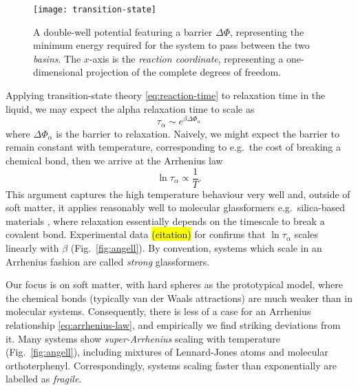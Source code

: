 \begin{SCfigure}
  \texttt{[image: transition-state]}
  \caption[Transition state theory]{
    A double-well potential featuring a barrier $\Delta\Phi$, representing the minimum energy required for the system to pass between the two \emph{basins}.
    The $x$-axis is the \emph{reaction coordinate}, representing a one-dimensional projection of the complete degrees of freedom.
  }
  \label{fig:transition-state}
\end{SCfigure}

Applying transition-state theory \eqref{eq:reaction-time} to relaxation time in the liquid, we may expect the alpha relaxation time to scale as
\begin{equation}\label{eq:tau-barrier}
  \tau_\alpha \sim e^{\beta \Delta \Phi_\alpha}
\end{equation}
where $\Delta \Phi_\alpha$ is the barrier to relaxation.
Naively, we might expect the barrier to remain constant with temperature, corresponding to e.g.\ the cost of breaking a chemical bond, then we arrive at the Arrhenius law
\begin{equation}\label{eq:arrhenius-law}
  \ln{\tau_\alpha} \propto \frac{1}{T}.
\end{equation}
This argument captures the high temperature behaviour very well and, outside of soft matter, it applies reasonably well to molecular glassformers e.g.\ silica-based materials%
,
where relaxation essentially depends on the timescale to break a covalent bond.
Experimental data \hl{(citation)} for  confirms that $\ln{\tau_\alpha}$ scales linearly with $\beta$ (Fig.\ \ref{fig:angell}).
By convention, systems which scale in an Arrhenius fashion are called \emph{strong}%
glassformers.

Our focus is on soft matter, with hard spheres as the prototypical model, where the  chemical bonds (typically van der Waals attractions) are much weaker than in molecular systems.
Consequently, there is less of a case for an Arrhenius relationship \eqref{eq:arrhenius-law}, and empirically we find striking deviations from it.
Many systems show \emph{super-Arrhenius} scaling with temperature (Fig.\ \ref{fig:angell}), including mixtures of Lennard-Jones atoms and molecular orthoterphenyl.
Correspondingly, systems scaling faster than exponentially are labelled as \emph{fragile}.

